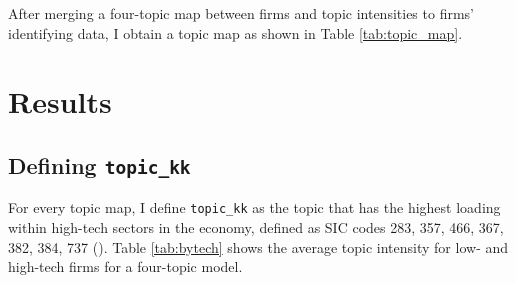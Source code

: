 \documentclass[12pt, letterpaper]{article}
\begin{document}

After merging a four-topic map between firms and topic intensities to firms' identifying data, I obtain a topic map as shown in Table \ref{tab:topic_map}.

\tiny

\normalsize







\section{Results}

\subsection{Defining \texttt{topic\_kk}}

For every topic map, I define \texttt{topic\_kk} as the topic that has the highest loading within high-tech sectors in the economy, defined as SIC codes 283, 357, 466, 367, 382, 384, 737 (\cite{Brown2009-zp}). Table \ref{tab:bytech} shows the average topic intensity for low- and high-tech firms for a four-topic model. 
\end{document}
